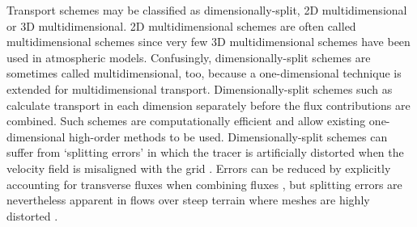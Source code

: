 %

%
%
%
%
%
%
%
%

Transport schemes may be classified as dimensionally-split, 2D multidimensional or 3D multidimensional.  2D multidimensional schemes are often called multidimensional schemes since very few 3D multidimensional schemes have been used in atmospheric models.
Confusingly, dimensionally-split schemes are sometimes called multidimensional, too, because a one-dimensional technique is extended for multidimensional transport.
Dimensionally-split schemes such as \citep{lin-rood1996,putman-lin2007,katta2015} calculate transport in each dimension separately before the flux contributions are combined.  Such schemes are computationally efficient and allow existing one-dimensional high-order methods to be used.
  Dimensionally-split schemes can suffer from `splitting errors' in which the tracer is artificially distorted when the velocity field is misaligned with the grid \citep{leonard1993}.  Errors can be reduced by explicitly accounting for transverse fluxes when combining fluxes \citep{leonard1996}, but splitting errors are nevertheless apparent in flows over steep terrain where meshes are highly distorted \citep{weller2017}.

